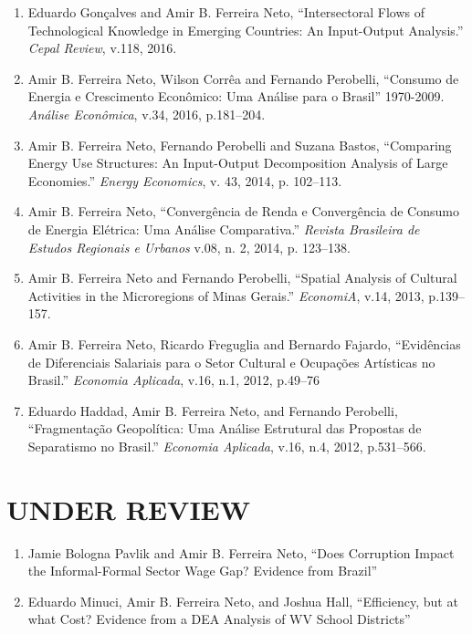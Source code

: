 \documentclass[11pt,a4paper,oneside]{article}
\begin{document}
\begin{enumerate}
  \item Eduardo Gon\c{c}alves and Amir B. Ferreira Neto, ``Intersectoral Flows of Technological Knowledge in Emerging Countries: An Input-Output Analysis.'' \emph{Cepal Review}, v.118, 2016.
  \item Amir B. Ferreira Neto, Wilson Corr\^ea and Fernando Perobelli, ``Consumo de Energia e Crescimento Econ\^omico: Uma An\'alise para o Brasil'' 1970-2009. \emph{An\'alise Econ\^omica}, v.34, 2016, p.181--204.
  \item Amir B. Ferreira Neto, Fernando Perobelli and Suzana Bastos, ``Comparing Energy Use Structures: An Input-Output Decomposition Analysis of Large Economies.'' \emph{Energy Economics}, v. 43, 2014, p. 102--113.
  \item Amir B. Ferreira Neto, ``Converg\^encia de Renda e Converg\^encia de Consumo de Energia El\'etrica: Uma An\'alise Comparativa.'' \emph{Revista Brasileira de Estudos Regionais e Urbanos} v.08, n. 2, 2014, p. 123--138.
  \item Amir B. Ferreira Neto and Fernando Perobelli, ``Spatial Analysis of Cultural Activities in the Microregions of Minas Gerais.'' \emph{EconomiA}, v.14, 2013, p.139--157.
  \item Amir B. Ferreira Neto, Ricardo Freguglia and Bernardo Fajardo, ``Evid\^encias de Diferenciais Salariais para o Setor Cultural e Ocupa\c{c}\~oes Art\'isticas no Brasil.'' \emph{Economia Aplicada}, v.16, n.1, 2012, p.49--76
  \item Eduardo Haddad, Amir B. Ferreira Neto, and Fernando Perobelli, ``Fragmenta\c{c}\~ao Geopol\'itica: Uma An\'alise Estrutural das Propostas de Separatismo no Brasil.'' \emph{Economia Aplicada}, v.16, n.4, 2012, p.531--566.
\end{enumerate}

\section{UNDER REVIEW}
\begin{enumerate}
  \item Jamie Bologna Pavlik and Amir B. Ferreira Neto, ``Does Corruption Impact the Informal-Formal Sector Wage Gap? Evidence from Brazil''
  \item Eduardo Minuci, Amir B. Ferreira Neto, and Joshua Hall, ``Efficiency, but at what Cost? Evidence from a DEA Analysis of WV School Districts''
\end{enumerate}
\end{document}
